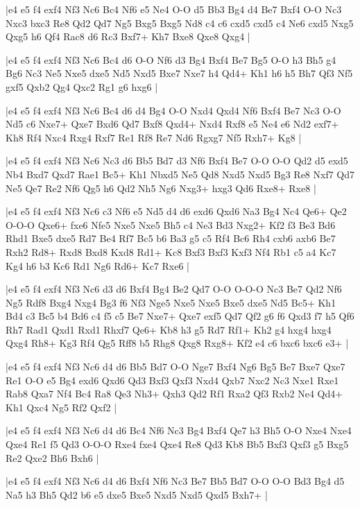 \whitename{}
\blackname{}
\makegametitle
|e4 e5 f4 exf4 Nf3 Nc6 Bc4 Nf6 e5 Ne4 O-O d5 Bb3 Bg4 d4 Be7 Bxf4 O-O Nc3 Nxc3 bxc3 Re8 Qd2 Qd7 Ng5 Bxg5 Bxg5 Nd8 c4 c6 cxd5 cxd5 c4 Ne6 cxd5 Nxg5 Qxg5 h6 Qf4 Rac8 d6 Rc3 Bxf7+ Kh7 Bxe8 Qxe8 Qxg4  |

\whitename{}
\blackname{}
\makegametitle
|e4 e5 f4 exf4 Nf3 Nc6 Bc4 d6 O-O Nf6 d3 Bg4 Bxf4 Be7 Bg5 O-O h3 Bh5 g4 Bg6 Nc3 Ne5 Nxe5 dxe5 Nd5 Nxd5 Bxe7 Nxe7 h4 Qd4+ Kh1 h6 h5 Bh7 Qf3 Nf5 gxf5 Qxb2 Qg4 Qxc2 Rg1 g6 hxg6  |

\whitename{}
\blackname{}
\makegametitle
|e4 e5 f4 exf4 Nf3 Nc6 Bc4 d6 d4 Bg4 O-O Nxd4 Qxd4 Nf6 Bxf4 Be7 Nc3 O-O Nd5 c6 Nxe7+ Qxe7 Bxd6 Qd7 Bxf8 Qxd4+ Nxd4 Rxf8 e5 Ne4 e6 Nd2 exf7+ Kh8 Rf4 Nxc4 Rxg4 Rxf7 Re1 Rf8 Re7 Nd6 Rgxg7 Nf5 Rxh7+ Kg8  |

\whitename{}
\blackname{}
\makegametitle
|e4 e5 f4 exf4 Nf3 Nc6 Nc3 d6 Bb5 Bd7 d3 Nf6 Bxf4 Be7 O-O O-O Qd2 d5 exd5 Nb4 Bxd7 Qxd7 Rae1 Bc5+ Kh1 Nbxd5 Ne5 Qd8 Nxd5 Nxd5 Bg3 Re8 Nxf7 Qd7 Ne5 Qe7 Re2 Nf6 Qg5 h6 Qd2 Nh5 Ng6 Nxg3+ hxg3 Qd6 Rxe8+ Rxe8  |

\whitename{}
\blackname{}
\makegametitle
|e4 e5 f4 exf4 Nf3 Nc6 c3 Nf6 e5 Nd5 d4 d6 exd6 Qxd6 Na3 Bg4 Nc4 Qe6+ Qe2 O-O-O Qxe6+ fxe6 Nfe5 Nxe5 Nxe5 Bh5 c4 Ne3 Bd3 Nxg2+ Kf2 f3 Be3 Bd6 Rhd1 Bxe5 dxe5 Rd7 Be4 Rf7 Bc5 b6 Ba3 g5 c5 Rf4 Bc6 Rh4 cxb6 axb6 Be7 Rxh2 Rd8+ Rxd8 Bxd8 Kxd8 Rd1+ Kc8 Bxf3 Bxf3 Kxf3 Nf4 Rb1 c5 a4 Kc7 Kg4 h6 b3 Kc6 Rd1 Ng6 Rd6+ Kc7 Rxe6  |

\whitename{}
\blackname{}
\makegametitle
|e4 e5 f4 exf4 Nf3 Nc6 d3 d6 Bxf4 Bg4 Be2 Qd7 O-O O-O-O Nc3 Be7 Qd2 Nf6 Ng5 Rdf8 Bxg4 Nxg4 Bg3 f6 Nf3 Nge5 Nxe5 Nxe5 Bxe5 dxe5 Nd5 Bc5+ Kh1 Bd4 c3 Bc5 b4 Bd6 c4 f5 c5 Be7 Nxe7+ Qxe7 exf5 Qd7 Qf2 g6 f6 Qxd3 f7 h5 Qf6 Rh7 Rad1 Qxd1 Rxd1 Rhxf7 Qe6+ Kb8 h3 g5 Rd7 Rf1+ Kh2 g4 hxg4 hxg4 Qxg4 Rh8+ Kg3 Rf4 Qg5 Rff8 b5 Rhg8 Qxg8 Rxg8+ Kf2 e4 c6 bxc6 bxc6 e3+  |

\whitename{}
\blackname{}
\makegametitle
|e4 e5 f4 exf4 Nf3 Nc6 d4 d6 Bb5 Bd7 O-O Nge7 Bxf4 Ng6 Bg5 Be7 Bxe7 Qxe7 Re1 O-O e5 Bg4 exd6 Qxd6 Qd3 Bxf3 Qxf3 Nxd4 Qxb7 Nxc2 Nc3 Nxe1 Rxe1 Rab8 Qxa7 Nf4 Bc4 Ra8 Qe3 Nh3+ Qxh3 Qd2 Rf1 Rxa2 Qf3 Rxb2 Ne4 Qd4+ Kh1 Qxc4 Ng5 Rf2 Qxf2  |

\whitename{}
\blackname{}
\makegametitle
|e4 e5 f4 exf4 Nf3 Nc6 d4 d6 Bc4 Nf6 Nc3 Bg4 Bxf4 Qe7 h3 Bh5 O-O Nxe4 Nxe4 Qxe4 Re1 f5 Qd3 O-O-O Rxe4 fxe4 Qxe4 Re8 Qd3 Kb8 Bb5 Bxf3 Qxf3 g5 Bxg5 Re2 Qxe2 Bh6 Bxh6  |

\whitename{}
\blackname{}
\makegametitle
|e4 e5 f4 exf4 Nf3 Nc6 d4 d6 Bxf4 Nf6 Nc3 Be7 Bb5 Bd7 O-O O-O Bd3 Bg4 d5 Na5 h3 Bh5 Qd2 b6 e5 dxe5 Bxe5 Nxd5 Nxd5 Qxd5 Bxh7+  |

